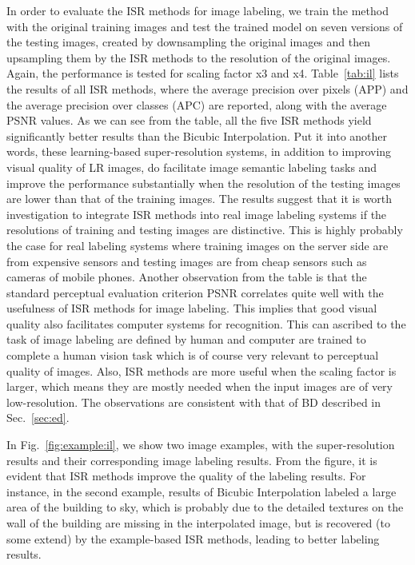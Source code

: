 \documentclass[10pt,twocolumn,letterpaper]{article}
\begin{document}
In order to evaluate the ISR methods for image labeling, we train the method~\cite{superpixel:eccv14} with the original training images and test the trained model on seven versions of the testing images, created by downsampling the original images and then upsampling them by the ISR methods to the resolution of the original images. Again, the performance is tested for scaling factor x3 and x4. 
Table~\ref{tab:il} lists the results of all ISR methods, where the average precision over pixels (APP) and the average precision over classes (APC) are reported, along with the average PSNR values. As we can see from the table, all the five ISR methods yield significantly  better results than the Bicubic Interpolation. Put it into another words, these learning-based super-resolution systems, in addition to improving visual quality of LR images, do facilitate image semantic labeling tasks and improve the performance substantially when the resolution of the testing images are lower than that of the training images. The results suggest that it is worth investigation to integrate ISR methods into real image labeling systems if the resolutions of training and testing images are distinctive. This is highly probably the case for real labeling systems where training images on the server side are from expensive sensors and testing images are from cheap sensors such as cameras of mobile phones. Another observation from the table is that the standard perceptual evaluation criterion PSNR correlates quite well with the usefulness of ISR methods for image labeling. This implies that good visual quality also facilitates computer systems for recognition. This can ascribed to the task of image labeling are defined by human and computer are trained to complete a human vision task which is of course very relevant to perceptual quality of images. Also, ISR methods are more useful when the scaling factor is larger, which means they are mostly needed when the input images are of very low-resolution.  The observations are consistent with that of BD described in Sec.~\ref{sec:ed}. 

In Fig.~\ref{fig:example:il}, we show two image examples, with the super-resolution results and their corresponding image labeling results. From the figure, it is evident that ISR methods improve the quality of the labeling results. For instance, in the second example, results of Bicubic Interpolation labeled a large area of the building to sky, which is probably due to the detailed textures on the wall of the building are missing in the interpolated image, but is recovered (to some extend) by the example-based ISR methods, leading to better labeling results.   
\end{document}
